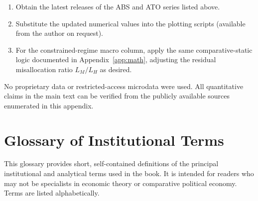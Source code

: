 \documentclass[12pt,anyside]{book}
\theoremstyle{definition}
\theoremstyle{plain}
\theoremstyle{remark}
\begin{document}
\begin{enumerate}
\item Obtain the latest releases of the ABS and ATO series listed above.
\item Substitute the updated numerical values into the plotting scripts (available from the author on request).
\item For the constrained-regime macro column, apply the same comparative-static logic documented in Appendix~\ref{app:math}, adjusting the residual misallocation ratio $L_M/L_H$ as desired.
\end{enumerate}

No proprietary data or restricted-access microdata were used. All quantitative claims in the main text can be verified from the publicly available sources enumerated in this appendix.

\chapter{Glossary of Institutional Terms}
\label{app:glossary}

This glossary provides short, self-contained definitions of the principal institutional and analytical terms used in the book. It is intended for readers who may not be specialists in economic theory or comparative political economy. Terms are listed alphabetically.
\end{document}
